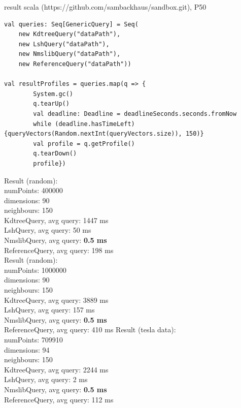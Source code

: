 \documentclass[xcolor=dvipsnames, aspectratio=1610]{beamer}
\newcommand{\alertA}[1]{\color{alertAcolor}#1\color{Black}}
\begin{document}
\begin{frame}[fragile]{result scala (https://github.com/sambackhaus/sandbox.git), P50} 
\linespread{1}\scriptsize{
\begin{minipage}{0.55\textwidth}  
\begin{lstlisting}[style=myScalastyle]
val queries: Seq[GenericQuery] = Seq(
	new KdtreeQuery("dataPath"),
	new LshQuery("dataPath"),
	new NmslibQuery("dataPath"),
	new ReferenceQuery("dataPath"))

val resultProfiles = queries.map(q => {
		System.gc()
		q.tearUp()
		val deadline: Deadline = deadlineSeconds.seconds.fromNow
		while (deadline.hasTimeLeft) {queryVectors(Random.nextInt(queryVectors.size)), 150)}
		val profile = q.getProfile()
		q.tearDown()
		profile})
\end{lstlisting}
\end{minipage}
\hfill
\begin{minipage}{0.40\textwidth}  

\begin{flushleft}
Result (random):\\
numPoints: 400000\\
dimensions: 90\\
neighbours: 150\\

KdtreeQuery, avg query: 1447 ms\\
LshQuery, avg query: 50 ms\\
NmslibQuery, avg query: {\alertA{\bf{0.5 ms}}}\\
ReferenceQuery, avg query: 198 ms\\
\vspace{0.2cm}
Result (random):\\
numPoints: 1000000\\
dimensions: 90\\
neighbours: 150\\

KdtreeQuery, avg query: 3889 ms\\
LshQuery, avg query: 157 ms\\
NmslibQuery, avg query: {\alertA{\bf{ 0.5 ms}}} \\
ReferenceQuery, avg query: 410 ms
\vspace{0.2cm}
Result (tesla data):\\
numPoints: 709910\\
dimensions: 94\\
neighbours: 150\\

KdtreeQuery, avg query: 2244 ms\\
LshQuery, avg query: 2 ms\\
NmslibQuery, avg query: {\alertA{\bf{0.5 ms}}}\\
ReferenceQuery, avg query: 112 ms\\
\end{flushleft}
\end{minipage}
}
\end{frame}
\end{document}
